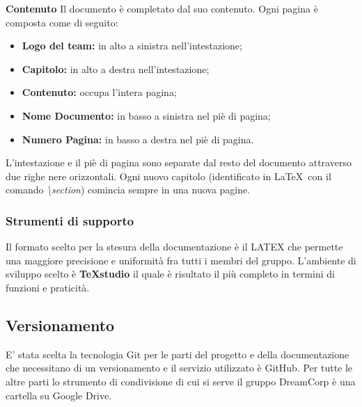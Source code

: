 		\newline \newline \textbf{Contenuto}  Il documento è completato dal suo contenuto. Ogni pagina è composta come di seguito:\newline
		\begin{itemize}
			\item \textbf{Logo del team:} in alto a sinistra nell'intestazione;
			\item \textbf{Capitolo:} in alto a destra nell'intestazione;
			\item \textbf{Contenuto:} occupa l'intera pagina;
			\item \textbf{Nome Documento:} in basso a sinistra nel piè di pagina;
			\item \textbf{Numero Pagina:} in basso a destra nel piè di pagina. \newline
		\end{itemize}
		L'intestazione e il piè di pagina sono separate dal resto del documento attraverso due righe nere orizzontali. Ogni nuovo capitolo (identificato in \LaTeX ~con il comando \textit{\textbackslash{}section}) comincia sempre in una nuova pagine.
		\subsubsection{Strumenti di supporto}
			Il formato scelto per la stesura della documentazione è il  LATEX che permette una maggiore precisione e uniformità fra tutti i membri del gruppo. L'ambiente di sviluppo scelto è \textbf{TeXstudio} il quale è risultato il più completo in termini di funzioni e praticità.
	\subsection{Versionamento}
		E' stata scelta la tecnologia Git per le parti del progetto e della documentazione che necessitano di un versionamento e il servizio utilizzato è GitHub. Per tutte le altre parti lo strumento di condivisione di cui si serve il gruppo DreamCorp è una cartella su Google Drive.
